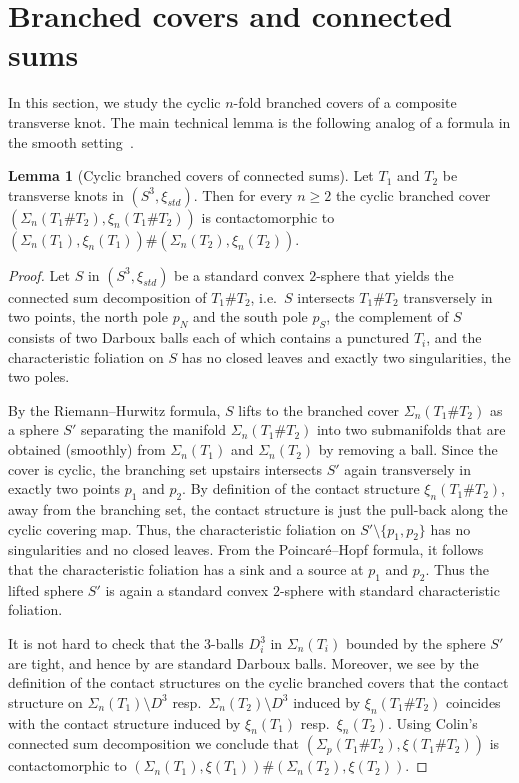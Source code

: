 \documentclass[11pt]{amsart}
\theoremstyle{definition}
\theoremstyle{definition}
\theoremstyle{definition}
\theoremstyle{definition}
\newtheorem{lemma}[theorem]{Lemma}
\begin{document}
\section{Branched covers and connected sums}

In this section, we study the cyclic $n$-fold branched covers of a composite transverse knot. The main technical lemma is the following analog of a formula in the smooth setting~\cite{Viro1,Viro2}.

\begin{lemma}[Cyclic branched covers of connected sums]\label{lem:sum}
    Let $T_1$ and $T_2$ be transverse knots in $(S^3,\xi_{std})$. Then for every $n\geq2$ the cyclic branched cover $(\Sigma_n(T_1 \# T_2),\xi_n(T_1 \# T_2))$ is contactomorphic to $(\Sigma_n(T_1),\xi_n(T_1)) \# (\Sigma_n(T_2),\xi_n(T_2))$.
\end{lemma}

\begin{proof}
Let $S$ in $(S^3,\xi_{std})$ be a standard convex $2$-sphere that yields the connected sum decomposition of $T_1\#T_2$, i.e.\ $S$ intersects $T_1\#T_2$ transversely in two points, the north pole $p_N$ and the south pole $p_S$, the complement of $S$ consists of two Darboux balls each of which contains a punctured $T_i$, and the characteristic foliation on $S$ has no closed leaves and exactly two singularities, the two poles.

By the Riemann--Hurwitz formula, $S$ lifts to the branched cover $\Sigma_n(T_1\#T_2)$ as a sphere $S'$ separating the manifold $\Sigma_n(T_1\#T_2)$ into two submanifolds that are obtained (smoothly) from $\Sigma_n(T_1)$ and $\Sigma_n(T_2)$ by removing a ball. Since the cover is cyclic, the branching set upstairs intersects $S'$ again transversely in exactly two points $p_1$ and $p_2$. By definition of the contact structure $\xi_n({T_1 \#T_2})$, away from the branching set, the contact structure is just the pull-back along the cyclic covering map. Thus, the characteristic foliation on $S'\setminus \{p_1,p_2\}$ has no singularities and no closed leaves. From the Poincaré--Hopf formula, it follows that the characteristic foliation has a sink and a source at $p_1$ and $p_2$. Thus the lifted sphere $S'$ is again a standard convex $2$-sphere with standard characteristic foliation.  

It is not hard to check that the $3$-balls $D_i^3$ in $\Sigma_n(T_i)$ bounded by the sphere $S'$ are tight, and hence by \cite{Eliashberg-20years} are standard Darboux balls. Moreover, we see by the definition of the contact structures on the cyclic branched covers that the contact structure on $\Sigma_n(T_1)\setminus D^3$ resp.\ $\Sigma_n(T_2)\setminus D^3$ induced by $\xi_n(T_1\#T_2)$ coincides with the contact structure induced by $\xi_n(T_1)$ resp.\ $\xi_n(T_2)$. 
Using Colin's connected sum decomposition \cite{Colin} we conclude that $(\Sigma_p(T_1 \#T_2),\xi(T_1\#T_2))$ is contactomorphic to $(\Sigma_n(T_1),\xi(T_1)) \# (\Sigma_n(T_2),\xi(T_2))$.
\end{proof}
\end{document}
